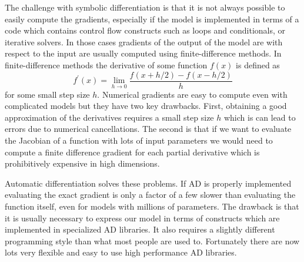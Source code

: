 \documentclass[12pt,dvipsnames]{report}
\begin{document}
The challenge with symbolic differentiation is that it is not always possible 
to easily compute the gradients, especially if the model is implemented in terms 
of a code which contains control flow constructs such as loops and conditionals, 
or iterative solvers. In those cases gradients of the output of the model 
are with respect to the input are usually computed using finite-difference 
methods. In finite-difference methods the derivative of some function $f(x)$
is defined as 
\begin{equation}
    f^\prime(x)=\lim _{h \rightarrow 0} \frac{f(x+h / 2)-f(x-h / 2)}{h}
\end{equation}
for some small step size $h$. Numerical gradients are easy to compute even with 
complicated models but they have two key drawbacks. First, obtaining a 
good approximation of the derivatives requires a small step size $h$ which is 
can lead to errors due to numerical cancellations.
The second is that if we want to evaluate the Jacobian of a function with lots 
of input parameters we would need to compute a finite difference gradient 
for each partial derivative which is prohibitively expensive in high dimensions.

Automatic differentiation solves these problems. If AD is properly implemented 
evaluating the exact gradient is only a factor of a few slower than evaluating 
the function itself, even for models with millions of parameters.
The drawback is that it is usually
necessary to express our model in terms of constructs which are implemented in 
specialized AD libraries. It also requires a slightly different programming style
than what most people are used to. Fortunately there are now lots very flexible 
and easy to use high performance AD libraries. 
\end{document}
